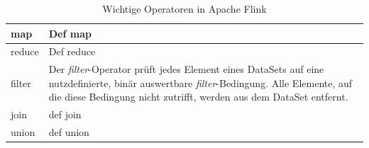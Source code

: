 \begin{table}
	\begin{tabular}[c]{| l | p{14cm} |}
		\hline
		map & Def map%
		\\
		\hline
		reduce & Def reduce \\
		\hline
		filter & Der \textit{filter}-Operator prüft jedes Element eines DataSets auf eine nutzdefinierte, binär auswertbare \textit{filter}-Bedingung. Alle Elemente, auf die diese Bedingung nicht zutrifft, werden aus dem DataSet entfernt. \\
		\hline
		join & def join \\
		\hline
		union & def union \\
		\hline
	\end{tabular}
	\caption{Wichtige Operatoren in Apache Flink}
\end{table}





